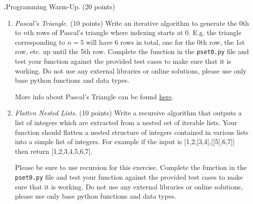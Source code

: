 \documentclass[12pt]{amsart}
\newenvironment{statement}[1]{\smallskip\noindent\color[rgb]{0.0,0.0,0.0} {\bf #1.}}{}
\theoremstyle{definition}
\theoremstyle{remark}
\newcommand{\1}{\mathds{1}}
\begin{document}
\newpage
\begin{statement}{3}
\emph{Programming Warm-Up.} (20 points)  
\begin{enumerate}
    \item \emph{Pascal's Triangle.} (10 points)
            \newline Write an iterative algorithm to generate the $0$th to $n$th rows of Pascal's triangle where indexing starts at 0. E.g. the triangle corresponding to $n=5$ will have 6 rows in total, one for the 0th row, the 1st row, etc. up until the 5th row. Complete the function in the \texttt{pset0.py} file and test your function against the provided test cases to make sure that it is working. Do not use any external libraries or online solutions, please use only base python functions and data types.
            
            \noindent More info about Pascal's Triangle can be found \href{https://en.wikipedia.org/wiki/Pascal\%27s\_triangle}{here}. \newline
            
    \item \emph{Flatten Nested Lists.} (10 points)
            \newline Write a recursive algorithm that outputs a list of integers which are extracted from a nested set of iterable lists. Your function should flatten a nested structure of integers contained in various lists into a simple list of integers. For example if the input is [1,2,[3,4],[[5],6,7]] then return [1,2,3,4,5,6,7].
           
           \noindent Please be sure to use recursion for this exercise. Complete the function in the \texttt{pset0.py} file and test your function against the provided test cases to make sure that it is working. Do not use any external libraries or online solutions, please use only base python functions and data types.
\end{enumerate}
\end{statement}
\end{document}
